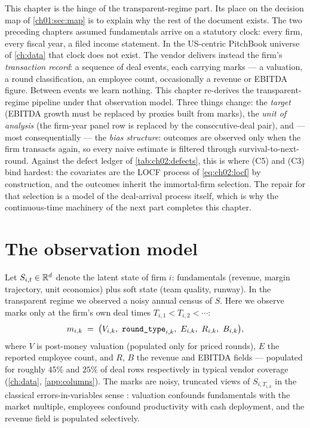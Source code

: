 
This chapter is the hinge of the transparent-regime part. Its place on the decision map of
\cref{ch01:sec:map} is to explain why the rest of the document exists. The two preceding
chapters assumed fundamentals arrive on a statutory clock: every firm, every fiscal year, a
filed income statement. In the US-centric PitchBook universe of \cref{ch:data} that clock does
not exist. The vendor delivers instead the firm's \emph{transaction record}: a sequence of deal
events, each carrying marks --- a valuation, a round classification, an employee count,
occasionally a revenue or EBITDA figure. Between events we learn nothing. This chapter
re-derives the transparent-regime pipeline under that observation model. Three things change:
the \emph{target} (EBITDA growth must be replaced by proxies built from marks), the \emph{unit
of analysis} (the firm-year panel row is replaced by the consecutive-deal pair), and --- most
consequentially --- the \emph{bias structure}: outcomes are observed only when the firm
transacts again, so every naive estimate is filtered through survival-to-next-round. Against
the defect ledger of \cref{tab:ch02:defects}, this is where (C5) and (C3) bind hardest: the
covariates are the LOCF process of \cref{eq:ch02:locf} by construction, and the outcomes
inherit the immortal-firm selection. The repair for that selection is a model of the
deal-arrival process itself, which is why the continuous-time machinery of the next part
completes this chapter.

\section{The observation model}\label{chpx:sec:obs}

Let $S_{i,t} \in \mathbb{R}^d$ denote the latent state of firm $i$: fundamentals (revenue, margin
trajectory, unit economics) plus soft state (team quality, runway). In the transparent regime we
observed a noisy annual census of $S$. Here we observe marks only at the firm's own deal times
$T_{i,1} < T_{i,2} < \cdots$:
\begin{equation}\label{eq:us-marks}
m_{i,k} \;=\; \big(V_{i,k},\ \texttt{round\_type}_{i,k},\ E_{i,k},\
R_{i,k},\ B_{i,k}\big),
\end{equation}
where $V$ is post-money valuation (populated only for priced rounds), $E$ the reported employee
count, and $R$, $B$ the revenue and EBITDA fields --- populated for roughly $45\%$ and $25\%$ of
deal rows respectively in typical vendor coverage (\cref{ch:data},
\cref{app:columns}). The marks are noisy, truncated views of $S_{i,T_{i,k}}$ in the classical
errors-in-variables sense \citep{carroll2006}: valuation confounds fundamentals with the market
multiple, employees confound productivity with cash deployment, and the revenue field is
populated selectively.

